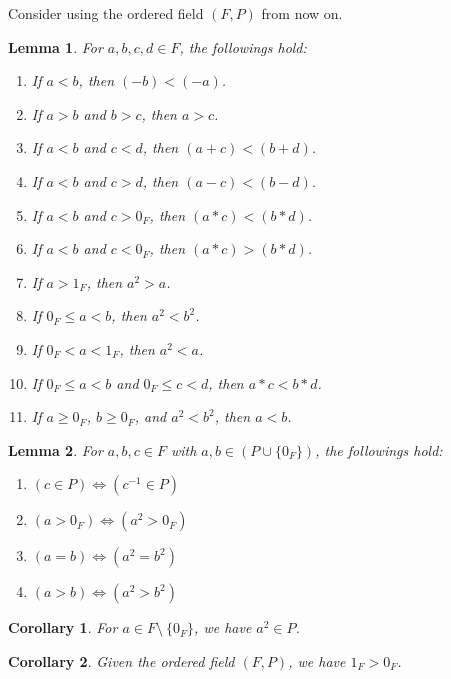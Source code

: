 \documentclass[11pt]{article}
\theoremstyle{break}
\theoremstyle{break}
\newtheorem{lem}{Lemma}[thm]
\newtheorem{corL}{Corollary}[lem]
\begin{document}
	\hfill\break
	\hfill\break
	\color{red} \noindent Consider using the ordered field $(F,P)$ from now on. \color{black}
	
	\begin{lem}
		For $a,b,c,d \in F$, the followings hold:
		\begin{enumerate}[topsep=3pt,itemsep=-1ex,partopsep=1ex,parsep=1ex]
			\item If $a<b$, then $(-b) < (-a)$.
			\item If $a>b$ and $b>c$, then $a>c$.
			\item If $a<b$ and $c<d$, then $(a+c)<(b+d)$.
			\item If $a<b$ and $c>d$, then $(a-c)<(b-d)$.
			\item If $a<b$ and $c>0_F$, then $(a \ast c)<(b \ast d)$.
			\item If $a<b$ and $c<0_F$, then $(a \ast c)>(b \ast d)$.
			\item If $a>1_F$, then $a^2 > a$.
			\item If $0_F \leq a < b$, then $a^2 < b^2$.
			\item If $0_F<a<1_F$, then $a^2 < a$.
			\item If $0_F \leq a <b$ and $0_F \leq c <d$, then $a \ast c< b \ast d$.
			\item If $a\geq 0_F$, $b \geq 0_F$, and $a^2 < b^2$, then $a<b$.
		\end{enumerate}
	\end{lem}

	\begin{lem}
		For $a,b,c \in F$ with $a,b \in (P \cup \{0_F \})$, the followings hold:
		\begin{enumerate}[topsep=3pt,itemsep=-1ex,partopsep=1ex,parsep=1ex]
			\item $(c \in P) \iff (c^{-1} \in P)$
			\item $(a>0_F) \iff (a^2 > 0_F)$
			\item $(a=b) \iff (a^2 = b^2)$
			\item $(a>b) \iff (a^2 > b^2)$
		\end{enumerate}
	\end{lem}
	
	\begin{corL}
		For $a \in F \setminus \ \{0_F \}$, we have $a^2 \in P$.
	\end{corL}
			
	\begin{corL}
		Given the ordered field $(F,P)$, we have $1_F > 0_F$.
	\end{corL}
	
\end{document}
